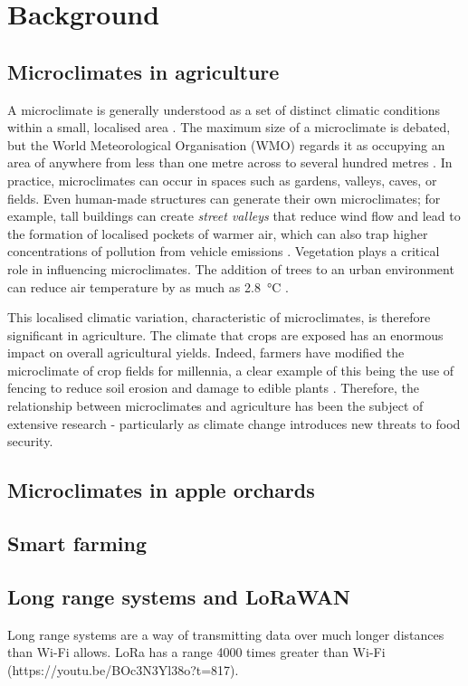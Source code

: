 \section{Background}

\subsection{Microclimates in agriculture}

A microclimate is generally understood as a set of distinct climatic conditions
within a small, localised area \cite{MetOffice2023}. The maximum
size of a microclimate is debated, but the World Meteorological Organisation
(WMO) regards it as occupying an area of anywhere from less than one metre
across to several hundred metres \cite{wmo2024}.  In practice, microclimates can
occur in spaces such as gardens, valleys, caves, or fields. Even human-made
structures can generate their own microclimates; for example, tall buildings can
create \emph{street valleys} that reduce wind flow and lead to the formation of
localised pockets of warmer air, which can also trap higher concentrations of
pollution from vehicle emissions \cite{yang2023}. Vegetation plays a critical
role in influencing microclimates. The addition of trees to an urban environment
can reduce air temperature by as much as \SI{2.8}{\degreeCelsius}
\cite{lai2019}.

This localised climatic variation, characteristic of microclimates, is therefore
significant in agriculture. The climate that crops are exposed has an enormous
impact on overall agricultural yields. Indeed, farmers have modified the
microclimate of crop fields for millennia, a clear example of this being the use
of fencing to reduce soil erosion and damage to edible plants \cite{cleugh1998}.
Therefore, the relationship between microclimates and agriculture has been the
subject of extensive research - particularly as climate change introduces new
threats to food security.

\subsection{Microclimates in apple orchards}

\subsection{Smart farming}

\subsection{Long range systems and LoRaWAN}

Long range systems are a way of transmitting data over much longer distances than
Wi-Fi allows. LoRa has a range 4000 times greater than Wi-Fi (https://youtu.be/BOc3N3Yl38o?t=817).


